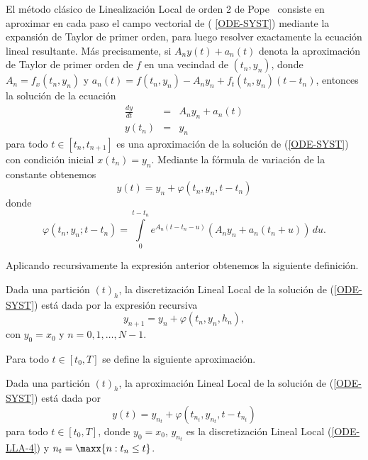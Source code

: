 El m\'{e}todo cl\'{a}sico de Linealizaci\'{o}n Local de orden 2 de Pope~\cite{pope}
 consiste en aproximar en cada paso el campo vectorial de (%
\ref{ODE-SYST}) mediante la expansi\'{o}n de Taylor de primer orden, para
luego resolver exactamente la ecuaci\'{o}n lineal resultante. M\'{a}s
precisamente, si $A_{n}y(t)+a_{n}(t)$ denota la aproximaci\'{o}n de Taylor
de primer orden de $f$ en una vecindad de $(t_n,y_{n})$, donde \mbox{$
	A_{n}=f_{x}(t_n,y_{n})$} y $a_{n}(t)=f(t_n,y_{n})-A_{n}y_{n}+f_t(t_n,y_n)(t-t_n)$, entonces la
soluci\'{o}n de la ecuaci\'{o}n 
\begin{eqnarray*}
\frac{dy}{dt} & = & A_{n}y_n+a_{n}(t) \\ %
y(t_{n})& = & y_{n}  \nonumber
\end{eqnarray*}
para todo $t\in[t_{n},t_{n+1}]$ es una aproximaci\'{o}n de la soluci\'{o}n
de (\ref{ODE-SYST}) con condici\'{o}n inicial \mbox{$x(t_{n})=y_{n}$}. Mediante la f\'{o}rmula de variaci\'{o}n de la constante obtenemos 
\begin{equation}
y(t)=y_{n}+\varphi(t_{n},y_{n},t-t_{n})  \label{ODE-SYST-FORM-LL}
\end{equation}
donde 
\begin{equation*}
\varphi(t_{n},y_{n};t-t_{n})=\int\limits^{t-t_{n}}_{0} e^{{A_{n}(t-t_{n}-u)}}
(A_{n}y_{n}+a_{n}(t_{n}+u))\,du.  %
\end{equation*}

Aplicando recursivamente la expresi\'{o}n anterior obtenemos la siguiente
definici\'{o}n.

\begin{definition}
	\label{definition LLD} Dada una partici\'{o}n $(t)_{h}$, la discretizaci\'{o}n Lineal Local de la soluci\'{o}n de (\ref{ODE-SYST}) est\'{a} dada por la expresi\'{o}n recursiva
	\begin{equation}
	y_{n+1}=y_{n}+\varphi \left( t_{n},y_{n},h_{n}\right) ,  \label{ODE-LLA-4}
	\end{equation}%
	con $y_{0}=x_{0}$ y $n=0,1,\ldots,N-1$.
\end{definition}

Para todo $t\in[t_{0},T]$ se define la siguiente aproximación.
\begin{definition}
	\label{definition LLA} Dada una partici\'{o}n $(t)_{h}$, la aproximaci\'{o}n
	Lineal Local de la soluci\'{o}n de (\ref{ODE-SYST}) est\'{a} dada por 
	\begin{equation}
	y(t)=y_{n_{t}}+\varphi(t_{n_{t}},y_{n_{t}},t-t_{n_{t}})
	\label{ODE-REV-FORM-LLA}
	\end{equation}
	para todo $t\in[t_{0},T]$, donde $y_{0}=x_{0}$, $y_{n_{t}}$ es la discretizaci\'{o}n Lineal Local (\ref{ODE-LLA-4}) y ${n_{t}=\maxx{n:t_{n}\leq t}}$.
\end{definition}

